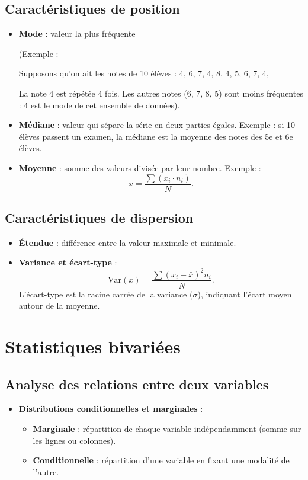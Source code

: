 \documentclass{article}
\begin{document}
\subsection*{Caractéristiques de position}
\begin{itemize}
    \item \textbf{Mode} : valeur la plus fréquente

(Exemple : 

Supposons qu'on ait les notes de 10 élèves :
4, 6, 7, 4, 8, 4, 5, 6, 7, 4,

La note 4 est répétée 4 fois.
Les autres notes (6, 7, 8, 5) sont moins fréquentes
: 4 est le mode de cet ensemble de données).
    \item \textbf{Médiane} : valeur qui sépare la série en deux parties égales. Exemple : si 10 élèves passent un examen, la médiane est la moyenne des notes des 5e et 6e élèves.
    \item \textbf{Moyenne} : somme des valeurs divisée par leur nombre. Exemple :
    \[
    \bar{x} = \frac{\sum (x_i \cdot n_i)}{N}.
    \]
\end{itemize}

\subsection*{Caractéristiques de dispersion}
\begin{itemize}
    \item \textbf{Étendue} : différence entre la valeur maximale et minimale.
    \item \textbf{Variance et écart-type} : 
    \[
    \text{Var}(x) = \frac{\sum (x_i - \bar{x})^2 n_i}{N}.
    \]
    L’écart-type est la racine carrée de la variance (\(\sigma\)), indiquant l'écart moyen autour de la moyenne.
\end{itemize}

\section*{Statistiques bivariées}

\subsection*{Analyse des relations entre deux variables}
\begin{itemize}
    \item \textbf{Distributions conditionnelles et marginales} : 
    \begin{itemize}
        \item \textbf{Marginale} : répartition de chaque variable indépendamment (somme sur les lignes ou colonnes).
        \item \textbf{Conditionnelle} : répartition d’une variable en fixant une modalité de l’autre.
    \end{itemize}
\end{itemize}
\end{document}
